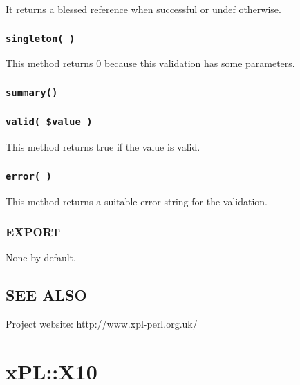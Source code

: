 \documentclass[12pt,a4paper]{article}
\begin{document}
It returns a blessed reference when successful or undef otherwise.

\subsubsection*{\texttt{singleton( )}\label{xPL::Validation::Set_singleton_}}


This method returns 0 because this validation has some parameters.

\subsubsection*{\texttt{summary()}\label{xPL::Validation::Set_summary_}}
\subsubsection*{\texttt{valid( \$value )}\label{xPL::Validation::Set_valid_value_}}


This method returns true if the value is valid.

\subsubsection*{\texttt{error( )}\label{xPL::Validation::Set_error_}}


This method returns a suitable error string for the validation.

\subsubsection*{EXPORT\label{xPL::Validation::Set_EXPORT}}


None by default.

\subsection*{SEE ALSO\label{xPL::Validation::Set_SEE_ALSO}}


Project website: http://www.xpl-perl.org.uk/

\newpage
\section{xPL::X10\label{xPL::X10}}
\end{document}
